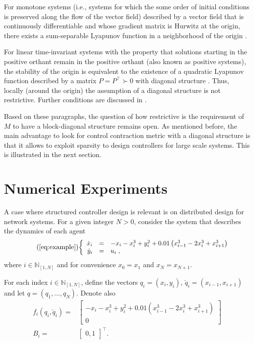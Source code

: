 \documentclass[10pt,twocolumn,twoside]{IEEEtran}
\newcounter{para}
\newcommand\mypara{\par}
\theoremstyle{plain}
\theoremstyle{definition}
\theoremstyle{remark}
\begin{document}
\mypara For monotone systems (i.e., systems for which the some order of initial conditions is preserved along the flow of the vector field) described by a vector field that is continuously differentiable and whose gradient matrix is Hurwitz at the origin, there exists a sum-separable Lyapunov function in a neighborhood of the origin \cite[Theorem 3.4]{Dirr2015}. 

\mypara For linear time-invariant systems with the property that solutions starting in the positive orthant remain in the positive orthant (also known as positive systems), the stability of the origin is equivalent to the existence of a quadratic Lyapunov function described by a matrix $P=P^\top\succ0$ with diagonal structure \cite{berman_nonnegative_1994}. Thus, locally (around the origin) the assumption of a diagonal structure is not restrictive. Further conditions are discussed in \cite{manchester_existence_2018}.

\mypara Based on these paragraphs, the question of how restrictive is the requirement of $M$ to have a block-diagonal structure remains open. As mentioned before, the main advantage to look for control contraction metric with a diagonal structure is that it allows to exploit sparsity to design controllers for large scale systems. This is illustrated in the next section.

\section{Numerical Experiments}\label{sec:Illustration}

\mypara A case where structured controller design is relevant is on distributed design for network systems. For a given integer $N>0$, consider the system that describes the dynamics of each agent
\begin{equation}\tag{\ref{eq:example}}
	\scalebox{0.95}{$\left\{\begin{array}{rcl}
		\dot{x}_i&=&-x_i-x_i^3+y_i^2 + 0.01\left(x_{i-1}^3 - 2x_i^3 +x_{i+1}^3\right)\\
		\dot{y}_i&=&u_i\;,
	\end{array}\right.$}
\end{equation}
where $i\in\mathbb{N}_{[1,N]}$ and for convenience $x_0=x_1$ and $x_N=x_{N+1}$. 

\mypara For each index $i\in\mathbb{N}_{[1,N]}$, define the vectors $q_i=(x_i,y_i)$, $\breve{q}_i=(x_{i-1},x_{i+1})$ and let $q=(q_1,\ldots,q_N)$. Denote also
\begin{align*}
	f_i(q_i,\breve{q}_i)=&\begin{bmatrix}
		-x_i-x_i^3+y_i^2 + 0.01\left(x_{i-1}^3 - 2x_i^3 +x_{i+1}^3\right)\\
		0
	\end{bmatrix}\\
	B_i=&\begin{bmatrix}
	0, 1
	\end{bmatrix}^\top.
\end{align*}
\end{document}
